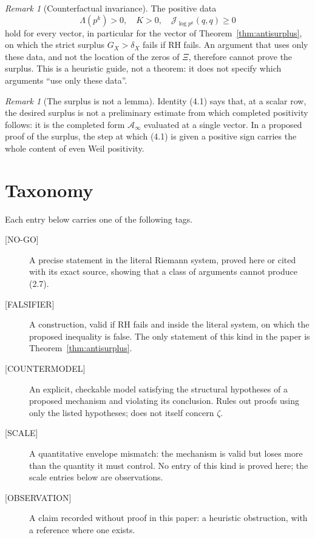 \documentclass[11pt]{amsart}
\theoremstyle{definition}
\theoremstyle{remark}
\newtheorem{remark}[theorem]{Remark}
\newcommand{\XiR}{\Xi}
\newcommand{\NOGO}{\textup{[NO-GO]}}
\newcommand{\FALS}{\textup{[FALSIFIER]}}
\newcommand{\CTMD}{\textup{[COUNTERMODEL]}}
\newcommand{\SCAL}{\textup{[SCALE]}}
\newcommand{\OBS}{\textup{[OBSERVATION]}}
\begin{document}
\begin{remark}[Counterfactual invariance]
\label{cor:invariance}
The positive data
\[
 \Lambda(p^k)>0,\quad K>0,\quad \mathcal J_{\log p^k}(q,q)\ge0
\]
hold for every vector, in particular for the vector of
Theorem~\ref{thm:antisurplus}, on which the strict surplus
\(G_X>\delta_X\) fails if RH fails.  An argument that uses only these
data, and not the location of the zeros of \(\XiR\), therefore cannot
prove the surplus.  This is a heuristic guide, not a theorem: it does not
specify which arguments ``use only these data''.
\end{remark}

\begin{remark}[The surplus is not a lemma]
\label{rem:notlemma}
Identity (4.1) says that, at a scalar row, the desired surplus is not a
preliminary estimate from which completed positivity follows: it is the
completed form \(\mathcal A_\infty\) evaluated at a single vector.  In a
proposed proof of the surplus, the step at which (4.1) is given a positive
sign carries the whole content of even Weil positivity.
\end{remark}

\section{Taxonomy}

Each entry below carries one of the following tags.

\begin{description}
\item[\NOGO] A precise statement in the literal Riemann system, proved here
 or cited with its exact source, showing that a class of arguments cannot
 produce (2.7).
\item[\FALS] A construction, valid if RH fails and inside the literal
 system, on which the proposed inequality is false.  The only statement
 of this kind in the paper is Theorem~\ref{thm:antisurplus}.
\item[\CTMD] An explicit, checkable model satisfying the structural
 hypotheses of a proposed mechanism and violating its conclusion.  Rules
 out proofs using only the listed hypotheses; does not itself concern
 \(\zeta\).
\item[\SCAL] A quantitative envelope mismatch: the mechanism is valid but
 loses more than the quantity it must control.  No entry of this kind is
 proved here; the scale entries below are observations.
\item[\OBS] A claim recorded without proof in this paper: a heuristic
 obstruction, with a reference where one exists.
\end{description}
\end{document}
